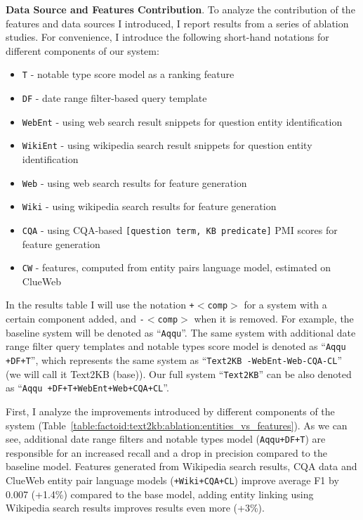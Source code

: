 \textbf{Data Source and Features Contribution}.
To analyze the contribution of the features and data sources I introduced, I report results from a series of ablation studies. For convenience, I introduce the following short-hand notations for different components of our system:

\begin{itemize}[noitemsep]
\item \texttt{T} - notable type score model as a ranking feature
\item \texttt{DF} - date range filter-based query template
\item \texttt{WebEnt} - using web search result snippets for question entity identification
\item \texttt{WikiEnt} - using wikipedia search result snippets for question entity identification
\item \texttt{Web} - using web search results for feature generation
\item \texttt{Wiki} - using wikipedia search results for feature generation
\item \texttt{CQA} - using CQA-based \texttt{[question term, KB predicate]} PMI scores for feature generation
\item \texttt{CW} - features, computed from entity pairs language model, estimated on ClueWeb
\end{itemize}

In the results table I will use the notation \texttt{+$<$comp$>$} for a system with a certain component added, and \texttt{-$<$comp$>$} when it is removed.
For example, the baseline system will be denoted as ``\texttt{Aqqu}''.
The same system with additional date range filter query templates and notable types score model is denoted as ``\texttt{Aqqu +DF+T}'', which represents the same system as ``\texttt{Text2KB -WebEnt-Web-CQA-CL}'' (we will call it Text2KB (base)).
Our full system ``\texttt{Text2KB}'' can be also denoted as ``\texttt{Aqqu +DF+T+WebEnt+Web+CQA+CL}''.

First, I analyze the improvements introduced by different components of the system (Table~\ref{table:factoid:text2kb:ablation:entities_vs_features}).
As we can see, additional date range filters and notable types model (\texttt{Aqqu+DF+T}) are responsible for an increased recall and a drop in precision compared to the baseline model.
Features generated from Wikipedia search results, CQA data and ClueWeb entity pair language models (\texttt{+Wiki+CQA+CL}) improve average F1 by 0.007 (+1.4\%) compared to the base model, adding entity linking using Wikipedia search results improves results even more (+3\%).


